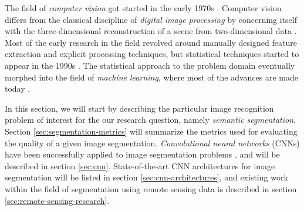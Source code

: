 The field of \textit{computer vision} got started in the early 1970s \cite[p.~10]{computer_vision_history}.
Computer vision differs from the classical discipline of \textit{digital image processing} by concerning itself with the three-dimensional reconstruction of a scene from two-dimensional data \cite[p.~10]{computer_vision_history}.
Most of the early research in the field revolved around manually designed feature extraction and explicit processing techniques, but statistical techniques started to appear in the 1990s \cite[p.~15]{computer_vision_history}.
The statistical approach to the problem domain eventually morphed into the field of \textit{machine learning}, where most of the advances are made today \cite[p.~17]{computer_vision_history}.

In this section, we will start by describing the particular image recognition problem of interest for the our research question, namely \textit{semantic segmentation}.
Section \ref{sec:segmentation-metrics} will summarize the metrics used for evaluating the quality of a given image segmentation.
\textit{Convolutional neural networks} (CNNs) have been successfully applied to image segmentation problems \cite[p.~1]{image_recognition}, and will be described in section \ref{sec:cnn}.
State-of-the-art CNN architectures for image segmentation will be listed in section \ref{sec:cnn-architectures}, and existing work within the field of segmentation using remote sensing data is described in section \ref{sec:remote-sensing-research}.
